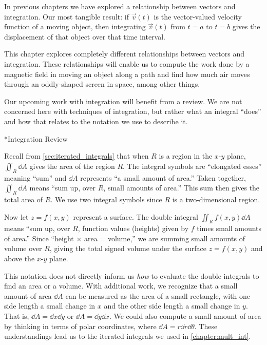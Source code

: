 In previous chapters we have explored a relationship between vectors and integration. Our most tangible result: if $\vec v(t)$ is the vector-valued velocity function of a moving object, then integrating $\vec v(t)$ from $t=a$ to $t=b$ gives the displacement of that object over that time interval.

This chapter explores completely different relationships between vectors and integration. These relationships will enable us to compute the work done by a magnetic field in moving an object along a path and find how much air moves through an oddly-shaped screen in space, among other things. 

Our upcoming work with integration will benefit from a review. We are not concerned here with techniques of integration, but rather what an integral ``does'' and how that relates to the notation we use to describe it.

\makeatletter
{}*{Integration Review}
\makeatother


Recall from \autoref{sec:iterated_integrals} that when $R$ is a region in the $x$-$y$ plane, $ \iint_R\dd A$ gives the area of the region $R$. The integral symbols are ``elongated esses'' meaning ``sum'' and $\dd A$ represents ``a small amount of area.'' Taken together, $\iint_R \dd A$ means ``sum up, over $R$, small amounts of area.'' This sum then gives the total area of $R$. We use two integral symbols since $R$ is a two-dimensional region.

Now let $z=f(x,y)$ represent a surface. The double integral $\iint_R f(x,y)\dd A$ means ``sum up, over $R$, function values (heights) given by $f$ times small amounts of area.'' Since ``height $\times$ area = volume,'' we are summing small amounts of volume over $R$, giving the total signed volume under the surface $z=f(x,y)$ and above the $x$-$y$ plane.

This notation does not directly inform us \emph{how} to evaluate the double integrals to find an area or a volume. With additional work, we recognize that a small amount of area $\dd A$ can be measured as the area of a small rectangle, with one side length a small change in $x$ and the other side length a small change in $y$. That is, $\dd A =\dd x\dd y$ or $\dd A =\dd y\dd x$. We could also compute a small amount of area by thinking in terms of polar coordinates, where $\dd A = r\dd r\dd\theta$. These understandings lead us to the iterated integrals we used in \autoref{chapter:mult_int}.

